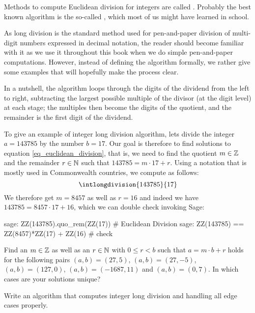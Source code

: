 Methods to compute Euclidean division for integers are called . Probably the best known algorithm is the so-called , which most of us might have learned in school.

As long division is the standard method used for pen-and-paper division of multi-digit numbers expressed in decimal notation, the reader should become familiar with it as we use it throughout this book when we do simple pen-and-paper computations. However, instead of defining the algorithm formally, we rather give some examples that will hopefully  make the process clear.

In a nutshell, the algorithm loops through the digits of the dividend from the left to right, subtracting the largest possible multiple of the divisor (at the digit level) at each stage; the multiples then become the digits of the quotient, and the remainder is the first digit of the dividend. 

\begin{example} To give an example of integer long division algorithm, lets divide the integer $a=143785$ by the number $b=17$. Our goal is therefore to find solutions to equation \ref{eq_euclidean_division}, that is, we need to find the quotient $m\in\mathbb{Z}$ and the remainder $r \in \mathbb{N}$ such that $143785 = m\cdot 17 + r$. Using a notation that is mostly used in Commonwealth countries, we compute as follows:
\begin{equation}
\intlongdivision{143785}{17}
\end{equation}
We therefore get $m=8457$ as well as $r=16$ and indeed we have $143785 = 8457\cdot 17 + 16$, which we can double check invoking Sage:
\begin{sagecommandline}
sage: ZZ(143785).quo_rem(ZZ(17)) # Euclidean Division
sage: ZZ(143785) == ZZ(8457)*ZZ(17) + ZZ(16) # check
\end{sagecommandline}

\end{example}
\begin{exercise}
Find an $m\in\mathbb{Z}$ as well as an $r\in\mathbb{N}$ with $0\leq r< b$ such that $a= m\cdot b +r$ holds for the following pairs $(a,b) = (27,5)$, $(a,b)=(27,-5)$, $(a,b)=(127,0)$, $(a,b)= (-1687, 11)$ and $(a,b)= (0, 7)$. In which cases are your solutions unique?
\end{exercise}
\begin{exercise}
Write an algorithm that computes integer long division and handling all edge cases properly.
\end{exercise}

